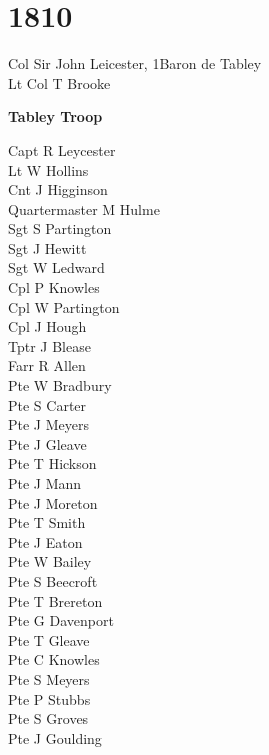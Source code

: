 \chapter*{1810}

\begin{multicols}{2}
  \noindent
  Col Sir John Leicester, 1\nth Baron de Tabley \\
  Lt Col T Brooke \\
\end{multicols}

\begin{center}
  \Large
  \textbf{Tabley Troop}
\end{center}

\begin{multicols}{2}
  \noindent
  Capt R Leycester \\
  Lt W Hollins \\
  Cnt J Higginson \\
  Quartermaster M Hulme \\
  Sgt S Partington \\
  Sgt J Hewitt \\
  Sgt W Ledward \\
  Cpl P Knowles \\
  Cpl W Partington \\
  Cpl J Hough \\
  Tptr J Blease \\
  Farr R Allen \\
  Pte W Bradbury \\
  Pte S Carter \\
  Pte J Meyers \\
  Pte J Gleave \\
  Pte T Hickson \\
  Pte J Mann \\
  Pte J Moreton \\
  Pte T Smith \\
  Pte J Eaton \\
  Pte W Bailey \\
  Pte S Beecroft \\
  Pte T Brereton \\
  Pte G Davenport \\
  Pte T Gleave \\
  Pte C Knowles \\
  Pte S Meyers \\
  Pte P Stubbs \\
  Pte S Groves \\
  Pte J Goulding \\

\end{multicols}
